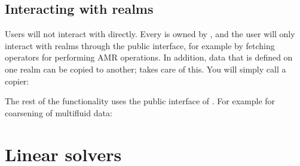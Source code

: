 \documentclass[letterpaper,10pt,english]{sphinxmanual}
\begin{document}
\subsection{Interacting with realms}
\label{\detokenize{Source/Realm:interacting-with-realms}}
Users will not interact with  directly.
Every  is owned by , and the user will only interact with realms through the public  interface, for example by fetching operators for performing AMR operations.
In addition, data that is defined on one realm can be copied to another;  takes care of this.
You will simply call a copier:

\begin{sphinxVerbatim}[commandchars=\\\{\},formatcom=\scriptsize]
 
 

\end{sphinxVerbatim}

The rest of the functionality uses the public interface of {\hyperref[\detokenize{Source/AmrMesh:chap-amrmesh}]{}}.
For example for coarsening of multifluid data:

\begin{sphinxVerbatim}[commandchars=\\\{\},formatcom=\scriptsize]
 
 
 

 
\end{sphinxVerbatim}


\section{Linear solvers}
\label{\detokenize{Source/LinearSolvers:linear-solvers}}\label{\detokenize{Source/LinearSolvers:chap-linearsolvers}}\label{\detokenize{Source/LinearSolvers::doc}}
\end{document}
